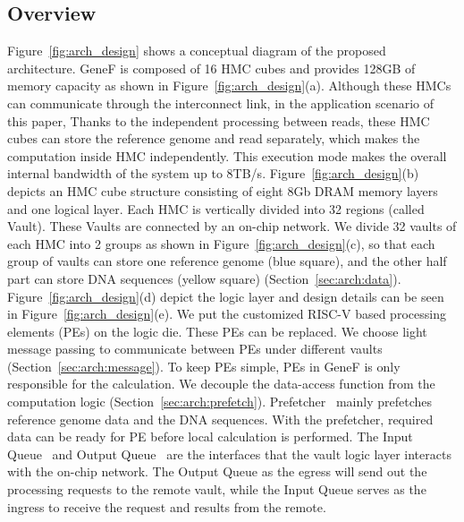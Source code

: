 \documentclass[9pt,conference]{IEEEtran}
\begin{document}
\subsection{Overview}
\label{sec:arch:overview}
Figure~\ref{fig:arch_design} shows a conceptual diagram of the proposed architecture. GeneF is composed of 16 HMC cubes and provides 128GB of memory capacity as shown in Figure~\ref{fig:arch_design}(a). Although these HMCs can communicate through the interconnect link, in the application scenario of this paper, Thanks to the independent processing between reads, these HMC cubes can store the reference genome and read separately, which makes the computation inside HMC independently. This execution mode makes the overall internal bandwidth of the system up to 8TB/s. Figure~\ref{fig:arch_design}(b) depicts an HMC cube structure consisting of eight 8Gb DRAM memory layers and one logical layer. Each HMC is vertically divided into 32 regions (called Vault). These Vaults are connected by an on-chip network. We divide 32 vaults of each HMC into 2 groups as shown in Figure~\ref{fig:arch_design}(c), so that each group of vaults can store one reference genome (blue square), and the other half part can store DNA sequences (yellow square) (Section~\ref{sec:arch:data}). Figure~\ref{fig:arch_design}(d) depict the logic layer and design details can be seen in Figure~\ref{fig:arch_design}(e). We put the customized RISC-V based processing elements (PEs) on the logic die. These PEs can be replaced. We choose light message passing to communicate between PEs under different vaults (Section~\ref{sec:arch:message}). To keep PEs simple, PEs in GeneF is only responsible for the calculation. We decouple the data-access function from the computation logic (Section~\ref{sec:arch:prefetch}).  Prefetcher~ mainly prefetches reference genome data and the DNA sequences. With the prefetcher, required data can be ready for PE before local calculation is performed. The Input Queue~ and Output Queue~ are the interfaces that the vault logic layer interacts with the on-chip network. The Output Queue as the egress will send out the processing requests to the remote vault, while the Input Queue serves as the ingress to receive the request and results from the remote.

\end{document}
